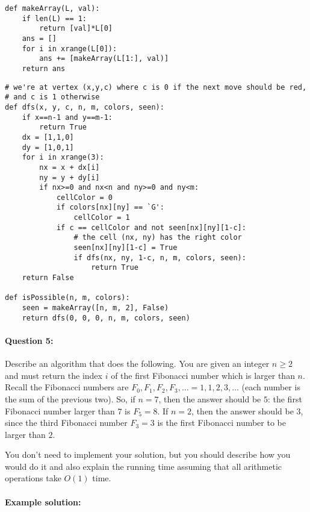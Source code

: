 \documentclass[11pt]{article}
\begin{document}
\begin{verbatim}
def makeArray(L, val):
    if len(L) == 1:
        return [val]*L[0]
    ans = []
    for i in xrange(L[0]):
        ans += [makeArray(L[1:], val)]
    return ans
\end{verbatim}

\newpage

\begin{verbatim}
# we're at vertex (x,y,c) where c is 0 if the next move should be red,
# and c is 1 otherwise
def dfs(x, y, c, n, m, colors, seen):
    if x==n-1 and y==m-1:
        return True
    dx = [1,1,0]
    dy = [1,0,1]
    for i in xrange(3):
        nx = x + dx[i]
        ny = y + dy[i]
        if nx>=0 and nx<n and ny>=0 and ny<m:
            cellColor = 0
            if colors[nx][ny] == `G': 
                cellColor = 1           
            if c == cellColor and not seen[nx][ny][1-c]:
                # the cell (nx, ny) has the right color
                seen[nx][ny][1-c] = True 
                if dfs(nx, ny, 1-c, n, m, colors, seen): 
                    return True
    return False          

def isPossible(n, m, colors):
    seen = makeArray([n, m, 2], False)
    return dfs(0, 0, 0, n, m, colors, seen)
\end{verbatim}

\newpage

\paragraph{Question 5:}
Describe an algorithm that does the following.  You are given an
integer $n\ge 2$ and must return the index $i$ of the first Fibonacci
number which is larger than $n$.  Recall the Fibonacci numbers are
$F_0,F_1,F_2,F_3,\ldots = 1,1,2,3,\ldots$ (each number is
the sum
of the previous two).  So, if $n=7$, then the answer should be $5$:
the first Fibonacci number larger than $7$ is $F_5 = 8$.  If $n=2$,
then the answer should be $3$, since the third Fibonacci number $F_3 =
3$ is the first Fibonacci
number to be larger than $2$.

You don't need to implement your solution, but you should describe how
you would do it and also explain the running time assuming that all
arithmetic operations take $O(1)$ time.

\paragraph{Example solution:}
\end{document}
